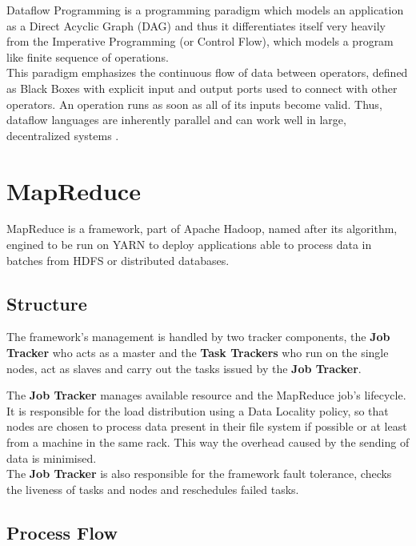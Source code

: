Dataflow Programming is a programming paradigm which models an application as a Direct Acyclic Graph (DAG) and thus it differentiates itself very heavily from the Imperative Programming (or Control Flow), which models a program like finite sequence of operations.\\
This paradigm emphasizes the continuous flow of data between operators, defined as Black Boxes with explicit input and output ports used to connect with other operators. An operation runs as soon as all of its inputs become valid. Thus, dataflow languages are inherently parallel and can work well in large, decentralized systems \cite{Johnston:2004:ADP:1013208.1013209}.

\pagebreak

\section{MapReduce} \label{MapReduce}

MapReduce \cite{hadoop_doc} is a framework, part of Apache Hadoop, named after its algorithm, engined to be run on YARN to deploy applications able to process data in batches from HDFS or distributed databases. \\

\subsection{Structure}
The framework's management is handled by two tracker components, the \textbf{Job Tracker} who acts as a master and the \textbf{Task Trackers} who run on the single nodes, act as slaves and carry out the tasks issued by the \textbf{Job Tracker}.

The \textbf{Job Tracker} manages available resource and the MapReduce job's lifecycle.\\ It is responsible for the load distribution using a Data Locality policy, so that nodes are chosen to process data present in their file system if possible or at least from a machine in the same rack. This way the overhead caused by the sending of data is minimised.
\\
The \textbf{Job Tracker} is also responsible for the framework fault tolerance, checks the liveness of tasks and nodes and reschedules failed tasks.

\subsection{Process Flow}

